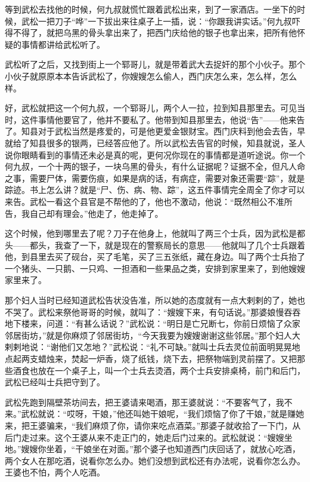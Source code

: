 \par 等到武松去找他的时候，何九叔就慌忙跟着武松出来，到了一家酒店。一坐下的时候，武松一把刀子“哗”一下拔出来往桌子上一插，说：“你跟我讲实话。”何九叔吓得不得了，就把乌黑的骨头拿出来了，把西门庆给他的银子也拿出来，把所有他怀疑的事情都讲给武松听了。
\par 武松听了之后，又找到街上一个郓哥儿，就是带着武大去捉奸的那个小伙子。那个小伙子就原原本本告诉武松了，你嫂嫂怎么偷人，西门庆怎么来，怎么样，怎么样。
\par 好，武松就把这一个何九叔，一个郓哥儿，两个人一拉，拉到知县那里去。可见当时，这件事情他要官了，他并不要私了。他带到知县那里去，他说“告”——他来告了。知县对于武松当然是疼爱的，可是他更爱金银财宝。西门庆料到他会去告，早就给了知县很多的银两，已经答应他了。所以武松去告官的时候，知县就说，圣人说你眼睛看到的事情还未必是真的呢，更何况你现在的事情都是道听途说。你一个何九叔，一个十两的银子，一块乌黑的骨头，有什么证据呢？证据不全，但凡人命之事，需要尸体，需要伤痕，如果是病的话，有病症，需要对象还需要“踪”，就是踪迹。书上怎么讲？就是“尸、伤、病、物、踪”，这五件事情完全周全了你才可以来告。武松一看这个县官是不帮他的了，他也不激动，他说：“既然相公不准所告，我自己却有理会。”他走了，他走掉了。
\par 这个时候，他到哪里去了呢？刀子在他身上，他就叫了两三个士兵，因为武松是都头——都头，我查了一下，就是现在的警察局长的意思——他就叫了几个士兵跟着他，到县里去买了砚台，买了毛笔，买了三五张纸，藏在身边。叫了两个士兵抬了一个猪头、一只鹅、一只鸡、一担酒和一些果品之类，安排到家里来了，到他嫂嫂家里来了。
\par 那个妇人当时已经知道武松告状没告准，所以她的态度就有一点大剌剌的了，她也不哭了。武松来祭他哥哥的时候，就叫了：“嫂嫂下来，有句话说。”那婆娘慢吞吞地下楼来，问道：“有甚么话说？”武松说：“明日是亡兄断七，你前日烦恼了众家邻居街坊，”就是你麻烦了邻居街坊，“今天我要为嫂嫂谢谢这些邻居。”那个妇人大剌剌地说：“谢他们又怎地？”武松说：“礼不可缺。”就叫士兵去灵位前面明晃晃地点起两支蜡烛来，焚起一炉香，烧了纸钱，烧下去，把祭物端到灵前摆了。又把那些酒食也放在一个桌子上，叫一个士兵去烫酒，两个士兵安排桌椅，前门和后门，武松已经叫士兵把守到了。
\par 武松先跑到隔壁茶坊间去，把王婆请来喝酒，那王婆就说：“不要客气了，我不来。”武松就说：“哎呀，干娘，”他还叫她干娘呢，“我们烦恼了你了干娘，”就是赚她来，把王婆骗来，“我们麻烦了你，请你来吃点酒菜。”那婆子就收拾了一下门，从后门走过来。这个王婆从来不走正门的，她走后门过来的。武松就说：“嫂嫂坐地。”嫂嫂你坐着，“干娘坐在对面。”那个婆子也知道西门庆回话了，就放心吃酒，两个女人在那吃酒，说看你怎么办。她们没想到武松还有办法呢，说看你怎么办。王婆也不怕，两个人吃酒。

